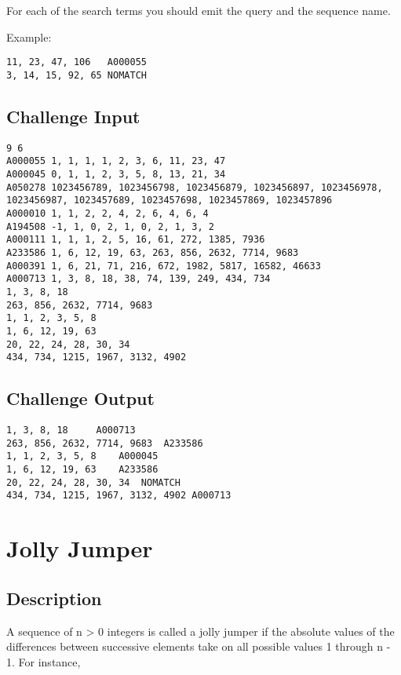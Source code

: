 For each of the search terms you should emit the query and the sequence
name.

Example:

\begin{lstlisting}
11, 23, 47, 106   A000055
3, 14, 15, 92, 65 NOMATCH
\end{lstlisting}

\subsection*{Challenge Input}\label{challenge-input-22}

\begin{lstlisting}
9 6
A000055 1, 1, 1, 1, 2, 3, 6, 11, 23, 47
A000045 0, 1, 1, 2, 3, 5, 8, 13, 21, 34
A050278 1023456789, 1023456798, 1023456879, 1023456897, 1023456978, 1023456987, 1023457689, 1023457698, 1023457869, 1023457896
A000010 1, 1, 2, 2, 4, 2, 6, 4, 6, 4
A194508 -1, 1, 0, 2, 1, 0, 2, 1, 3, 2
A000111 1, 1, 1, 2, 5, 16, 61, 272, 1385, 7936
A233586 1, 6, 12, 19, 63, 263, 856, 2632, 7714, 9683
A000391 1, 6, 21, 71, 216, 672, 1982, 5817, 16582, 46633
A000713 1, 3, 8, 18, 38, 74, 139, 249, 434, 734
1, 3, 8, 18
263, 856, 2632, 7714, 9683
1, 1, 2, 3, 5, 8
1, 6, 12, 19, 63
20, 22, 24, 28, 30, 34
434, 734, 1215, 1967, 3132, 4902
\end{lstlisting}

\subsection*{Challenge Output}\label{challenge-output-19}

\begin{lstlisting}
1, 3, 8, 18     A000713
263, 856, 2632, 7714, 9683  A233586
1, 1, 2, 3, 5, 8    A000045
1, 6, 12, 19, 63    A233586
20, 22, 24, 28, 30, 34  NOMATCH
434, 734, 1215, 1967, 3132, 4902 A000713
\end{lstlisting}


\section{Jolly Jumper}

\subsection*{Description}\label{description-29}

A sequence of n \textgreater{} 0 integers is called a jolly jumper if
the absolute values of the differences between successive elements take
on all possible values 1 through n - 1. For instance,

